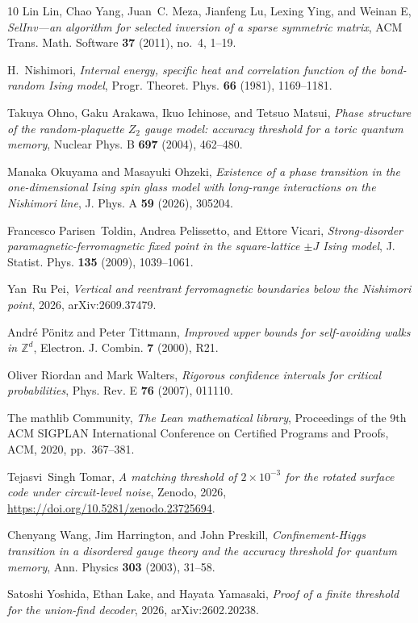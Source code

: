 \documentclass[11pt]{amsart}
\theoremstyle{definition}
\theoremstyle{remark}
\numberwithin{equation}{section}
\begin{document}
\begin{thebibliography}{10}
Lin Lin, Chao Yang, Juan~C. Meza, Jianfeng Lu, Lexing Ying, and Weinan E,
  \emph{{SelInv}---an algorithm for selected inversion of a sparse symmetric
  matrix}, ACM Trans. Math. Software \textbf{37} (2011), no.~4, 1--19.

H.~Nishimori, \emph{Internal energy, specific heat and correlation function of
  the bond-random {I}sing model}, Progr. Theoret. Phys. \textbf{66} (1981),
  1169--1181.

Takuya Ohno, Gaku Arakawa, Ikuo Ichinose, and Tetsuo Matsui, \emph{Phase
  structure of the random-plaquette ${Z}_2$ gauge model: accuracy threshold for
  a toric quantum memory}, Nuclear Phys. B \textbf{697} (2004), 462--480.

Manaka Okuyama and Masayuki Ohzeki, \emph{Existence of a phase transition in
  the one-dimensional {I}sing spin glass model with long-range interactions on
  the {N}ishimori line}, J. Phys. A \textbf{59} (2026), 305204.

Francesco Parisen~Toldin, Andrea Pelissetto, and Ettore Vicari,
  \emph{Strong-disorder paramagnetic-ferromagnetic fixed point in the
  square-lattice {$\pm J$} {I}sing model}, J. Statist. Phys. \textbf{135}
  (2009), 1039--1061.

Yan~Ru Pei, \emph{Vertical and reentrant ferromagnetic boundaries below the
  {N}ishimori point}, 2026, arXiv:2609.37479.

Andr{\'e} P{\"o}nitz and Peter Tittmann, \emph{Improved upper bounds for
  self-avoiding walks in $\mathbb{Z}^d$}, Electron. J. Combin. \textbf{7}
  (2000), R21.

Oliver Riordan and Mark Walters, \emph{Rigorous confidence intervals for
  critical probabilities}, Phys. Rev. E \textbf{76} (2007), 011110.

{The mathlib Community}, \emph{The {L}ean mathematical library}, Proceedings of
  the 9th {ACM} {SIGPLAN} International Conference on Certified Programs and
  Proofs, ACM, 2020, pp.~367--381.

Tejasvi~Singh Tomar, \emph{A matching threshold of $2\times10^{-3}$ for the
  rotated surface code under circuit-level noise}, Zenodo, 2026,
  \url{https://doi.org/10.5281/zenodo.23725694}.

Chenyang Wang, Jim Harrington, and John Preskill, \emph{Confinement-{H}iggs
  transition in a disordered gauge theory and the accuracy threshold for
  quantum memory}, Ann. Physics \textbf{303} (2003), 31--58.

Satoshi Yoshida, Ethan Lake, and Hayata Yamasaki, \emph{Proof of a finite
  threshold for the union-find decoder}, 2026, arXiv:2602.20238.

\end{thebibliography}
\end{document}
